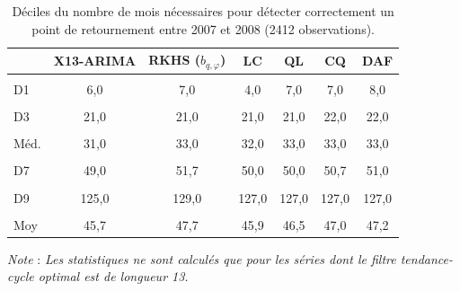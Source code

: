 \documentclass[
  11pt,
  french,
  a4paper]{article}
\newcommand\1{\mathds{1}}
\begin{document}
\begin{table}[!h]

\caption{\label{tab:covid-quantile-crisis}Déciles du nombre de mois nécessaires pour détecter correctement un point de retournement entre 2007 et 2008 (2412 observations).}
\centering
\begin{tabular}[t]{lcccccc}
\toprule
  & X13-ARIMA & RKHS ($b_{q,\varphi}$) & LC & QL & CQ & DAF\\
\midrule
\cellcolor{gray!6}{Min} & \cellcolor{gray!6}{2,0} & \cellcolor{gray!6}{5,0} & \cellcolor{gray!6}{2,0} & \cellcolor{gray!6}{2,0} & \cellcolor{gray!6}{2,0} & \cellcolor{gray!6}{2,0}\\
D1 & 6,0 & 7,0 & 4,0 & 7,0 & 7,0 & 8,0\\
\cellcolor{gray!6}{D2} & \cellcolor{gray!6}{15,0} & \cellcolor{gray!6}{15,0} & \cellcolor{gray!6}{14,2} & \cellcolor{gray!6}{15,0} & \cellcolor{gray!6}{16,0} & \cellcolor{gray!6}{16,0}\\
D3 & 21,0 & 21,0 & 21,0 & 21,0 & 22,0 & 22,0\\
\cellcolor{gray!6}{D4} & \cellcolor{gray!6}{26,0} & \cellcolor{gray!6}{27,0} & \cellcolor{gray!6}{26,0} & \cellcolor{gray!6}{27,0} & \cellcolor{gray!6}{27,0} & \cellcolor{gray!6}{28,0}\\
\addlinespace
Méd. & 31,0 & 33,0 & 32,0 & 33,0 & 33,0 & 33,0\\
\cellcolor{gray!6}{D6} & \cellcolor{gray!6}{38,0} & \cellcolor{gray!6}{41,0} & \cellcolor{gray!6}{39,0} & \cellcolor{gray!6}{40,0} & \cellcolor{gray!6}{40,0} & \cellcolor{gray!6}{40,0}\\
D7 & 49,0 & 51,7 & 50,0 & 50,0 & 50,7 & 51,0\\
\cellcolor{gray!6}{D8} & \cellcolor{gray!6}{67,8} & \cellcolor{gray!6}{71,0} & \cellcolor{gray!6}{68,0} & \cellcolor{gray!6}{68,0} & \cellcolor{gray!6}{68,0} & \cellcolor{gray!6}{68,0}\\
D9 & 125,0 & 129,0 & 127,0 & 127,0 & 127,0 & 127,0\\
\addlinespace
\cellcolor{gray!6}{Max} & \cellcolor{gray!6}{169,0} & \cellcolor{gray!6}{169,0} & \cellcolor{gray!6}{169,0} & \cellcolor{gray!6}{169,0} & \cellcolor{gray!6}{169,0} & \cellcolor{gray!6}{169,0}\\
Moy & 45,7 & 47,7 & 45,9 & 46,5 & 47,0 & 47,2\\
\bottomrule
\end{tabular}
\footnotesize


\emph{Note} : \emph{Les statistiques ne sont calculés que pour les séries dont le filtre tendance-cycle optimal est de longueur 13.}
\normalsize\end{table}
\end{document}
